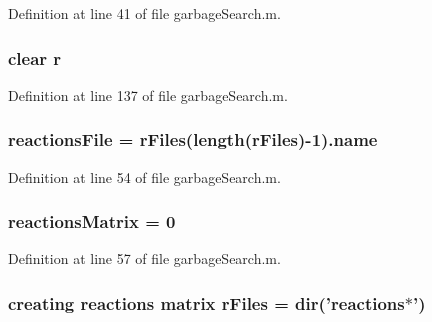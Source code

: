 Definition at line 41 of file garbage\+Search.\+m.

\hypertarget{a00027_ac862e7284527eb913b1351c8bfb8e079}{
\subsubsection[{r}]{\setlength{\rightskip}{0pt plus 5cm}clear r}}\label{a00027_ac862e7284527eb913b1351c8bfb8e079}


Definition at line 137 of file garbage\+Search.\+m.

\hypertarget{a00027_a4c72dba1fe2ee2fbcc699262a8d0c624}{
\subsubsection[{reactions\+File}]{\setlength{\rightskip}{0pt plus 5cm}reactions\+File = {\bf r\+Files}(length({\bf r\+Files})-\/1).{\bf name}}}\label{a00027_a4c72dba1fe2ee2fbcc699262a8d0c624}


Definition at line 54 of file garbage\+Search.\+m.

\hypertarget{a00027_ac52097a2745fcef31eb175d2e9485845}{
\subsubsection[{reactions\+Matrix}]{\setlength{\rightskip}{0pt plus 5cm}reactions\+Matrix = 0}}\label{a00027_ac52097a2745fcef31eb175d2e9485845}


Definition at line 57 of file garbage\+Search.\+m.

\hypertarget{a00027_ad75735665492cabd747370126464fddf}{
\subsubsection[{r\+Files}]{\setlength{\rightskip}{0pt plus 5cm}creating {\bf reactions} matrix r\+Files = {\bf dir}('{\bf reactions}$\ast$')}}\label{a00027_ad75735665492cabd747370126464fddf}



